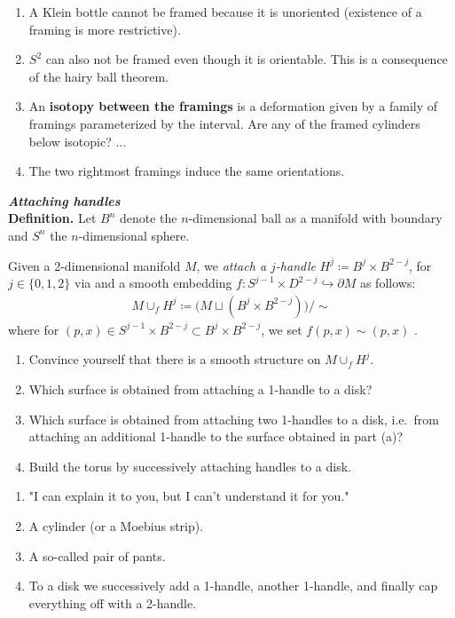 \begin{enumerate}[label=(\alph*)]
	\item A Klein bottle cannot be framed because it is unoriented (existence of a framing is more restrictive).
	  \item $S^2$ can also not be framed even though it is orientable. This is a consequence of the hairy ball theorem.
          \item An \textbf{isotopy between the framings} is a deformation given by a family of framings parameterized by the interval. 
        Are any of the framed cylinders below isotopic? ...
        \item The two rightmost framings induce the same orientations.
	\end{enumerate}


\begin{exercise} \textbf{\textit{Attaching handles}}\\
\textbf{Definition.} Let \(B^n\) denote the \(n\)-dimensional ball as a manifold with boundary and \(S^n\) the \(n\)-dimensional sphere. 

Given a 2-dimensional manifold $M$, we {\em attach a \(j\)-handle} \(H^j\coloneq B^j \times B^{2-j}\), for \(j\in \{0,1,2\}\) via  and a smooth embedding \(f: S^{j-1}\times D^{2-j} \hookrightarrow \partial M\) as follows: 
\begin{align*}
	M\cup_f H^j \coloneq \big( M\sqcup (B^j \times B^{2-j}) \big) / \sim
\end{align*}
where for \((p,x) \in S^{j-1}\times B^{2-j} \subset B^j \times B^{2-j}\), we set \(f(p,x)\sim (p,x)\) . 
	\begin{enumerate}[label=(\alph*)]
	\item Convince yourself that there is a smooth structure on $M\cup_f H^j$.
	\item Which surface is obtained from attaching a 1-handle to a disk?
	\item Which surface is obtained from attaching two 1-handles to a disk, i.e.~from attaching an additional 1-handle to the surface obtained in part (a)?
	\item Build the torus by successively attaching handles to a disk.
	\end{enumerate}
\end{exercise}

	\begin{enumerate}[label=(\alph*)]
	\item "I can explain it to you, but I can't understand it for you."
	\item A cylinder (or a Moebius strip).
	\item A so-called pair of pants.
	\item To a disk we successively add a 1-handle, another 1-handle, and finally cap everything off with a 2-handle.
	\end{enumerate}




